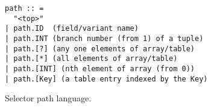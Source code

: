    
\begin{figure}
{\small
\begin{verbatim}
path :: =  
  "<top>"
| path.ID  (field/variant name)
| path.INT (branch number (from 1) of a tuple)
| path.[?] (any one elements of array/table) 
| path.[*] (all elements of array/table) 
| path.[INT] (nth element of array (from 0))
| path.[Key] (a table entry indexed by the Key)
\end{verbatim}
}
\caption{Selector path language.}
\label{fig:selector-lang}
\end{figure}


